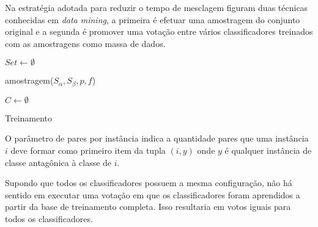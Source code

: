 Na estratégia adotada para reduzir o tempo de mesclagem figuram duas técnicas conhecidas em \emph{data mining}, a primeira é efetuar uma amostragem do conjunto original e a segunda é promover uma votação entre vários classificadores treinados com as amostragens como massa de dados.

\begin{function}

    $Set \gets \emptyset$\;
    


    \caption{amostragem($S_{\alpha}, S_{\beta}, p, f$)}
    \label{func:amostragem}
\end{function}

\begin{algorithm}

    $C \gets \emptyset$



    \caption{Treinamento}
    \label{alg:treinamento}
\end{algorithm}

O parâmetro de pares por instância indica a quantidade pares que uma instância $i$ deve formar como primeiro item da tupla $(i, y)$ onde $y$ é qualquer instância de classe antagônica à classe de $i$.

Supondo que todos os classificadores possuem a mesma configuração, não há sentido em executar uma votação em que os classificadores foram aprendidos a partir da base de treinamento completa. Isso resultaria em votos iguais para todos os classificadores.

